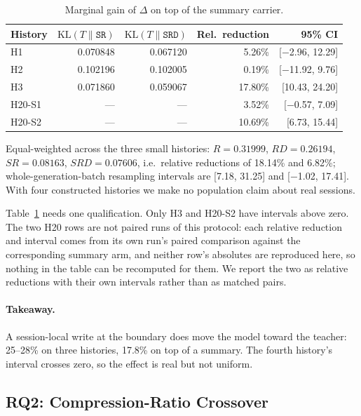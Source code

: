 \documentclass[sigconf,nonacm]{acmart}
\newcommand{\KL}{\mathrm{KL}}
\newcommand{\St}{\texttt{SR}}
\newcommand{\Sd}{\texttt{SRD}}
\begin{document}
\begin{table}[b]
\centering
\small
\begin{tabular}{lrrrr}
\toprule
History & $\KL(T\|\St)$ & $\KL(T\|\Sd)$ & Rel.\ reduction & 95\% CI \\
\midrule
H1 & 0.070848 & 0.067120 & 5.26\% & [$-$2.96, 12.29] \\
H2 & 0.102196 & 0.102005 & 0.19\% & [$-$11.92, 9.76] \\
H3 & 0.071860 & 0.059067 & 17.80\% & [10.43, 24.20] \\
H20-S1 & --- & --- & 3.52\% & [$-$0.57, 7.09] \\
H20-S2 & --- & --- & 10.69\% & [6.73, 15.44] \\
\bottomrule
\end{tabular}
\caption{Marginal gain of $\Delta$ on top of the summary carrier.}
\label{tab:marginal}
\end{table}

Equal-weighted across the three small histories: $R=0.31999$, $RD=0.26194$, $SR=0.08163$, $SRD=0.07606$,
i.e.\ relative reductions of 18.14\% and 6.82\%; whole-generation-batch resampling intervals are
[7.18, 31.25] and [$-$1.02, 17.41]. With four constructed histories we make no population claim about
real sessions.

Table~\ref{tab:marginal} needs one qualification. Only H3 and H20-S2 have
intervals above zero. The two H20 rows are not paired runs of this protocol: each relative reduction and interval
comes from its own run's paired comparison against the corresponding summary arm, and neither row's absolutes are
reproduced here, so nothing in the table can be recomputed for them. We report the two as relative reductions with
their own intervals rather than as matched pairs.

\paragraph{Takeaway.} A session-local write at the boundary does move the model toward the teacher: 25--28\% on
three histories, 17.8\% on top of a summary. The fourth history's interval crosses zero, so the effect is real
but not uniform.

\subsection{RQ2: Compression-Ratio Crossover}\label{sec:crossover}
\end{document}
